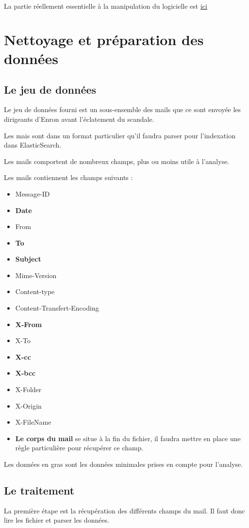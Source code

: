 \documentclass[11pt,letterpaper]{article}
\begin{document}
	La partie réellement essentielle à la manipulation du logicielle est \href{https://nifi.apache.org/docs/nifi-docs/html/getting-started.html#i-started-nifi-now-what}{ici}
	\section*{Nettoyage et préparation des données}
	\subsection*{Le jeu de données}
	Le jeu de données fourni est un sous-ensemble des mails que ce sont envoyée les dirigeants d'Enron avant l'éclatement du scandale.
	
	Les mais sont dans un format particulier qu'il faudra parser pour l'indexation dans ElasticSearch.
	
	Les mails comportent de nombreux champs, plus ou moins utile à l'analyse.
	
	Les mails contiennent les champs suivants :
	\begin{itemize}
		\item Message-ID
		\item \textbf{Date}
		\item From
		\item \textbf{To}
		\item \textbf{Subject}
		\item Mime-Version
		\item Content-type
		\item Content-Transfert-Encoding
		\item \textbf{X-From}
		\item X-To
		\item \textbf{X-cc}
		\item \textbf{X-bcc}
		\item X-Folder
		\item X-Origin
		\item X-FileName
		\item \textbf{Le corps du mail} se situe à la fin du fichier, il faudra mettre en place une règle particulière pour récupérer ce champ.
	\end{itemize}
	Les données en gras sont les données minimales prises en compte pour l'analyse.
	\subsection*{Le traitement}
	La première étape est la récupération des différents champs du mail. Il faut donc lire les fichier et parser les données.
	
\end{document}
